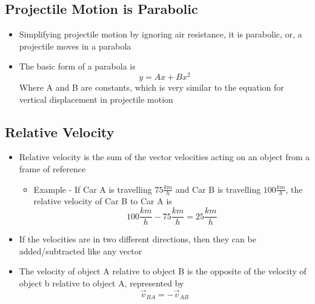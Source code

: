 \subsection{Projectile Motion is Parabolic}
\begin{itemize}
    \item Simplifying projectile motion by ignoring air resistance, it is parabolic, or, a projectile moves in a parabola
    \item The basic form of a parabola is \[y=Ax+Bx^2\] Where A and B are constants, which is very similar to the equation for vertical displacement in projectile motion 
\end{itemize}

\subsection{Relative Velocity}
\begin{itemize}
    \item Relative velocity is the sum of the vector velocities acting on an object from a frame of reference
    \begin{itemize}
        \item Example - If Car A is travelling $75\frac{km}{h}$ and Car B is travelling $100\frac{km}{h}$, the relative velocity of Car B to Car A is \[100\frac{km}{h}-75\frac{km}{h}=25\frac{km}{h}\]
    \end{itemize}
    \item If the velocities are in two different directions, then they can be added/subtracted like any vector
    \item The velocity of object A relative to object B is the opposite of the velocity of object b relative to object A, represented by \[\vec{v}_{BA}=-\vec{v}_{AB}\]
\end{itemize}

\newpage

